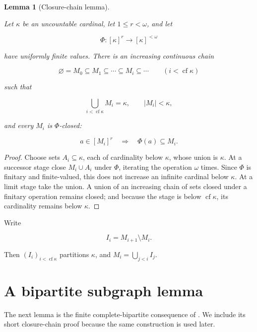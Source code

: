 \documentclass[a4paper,11pt,reqno]{amsart}
\theoremstyle{plain}
\newtheorem{lemma}[theorem]{Lemma}
\theoremstyle{definition}
\theoremstyle{remark}
\begin{document}
\begin{lemma}[Closure-chain lemma]\label{lemma-1.4-closure-chain-lemma}

Let \(\kappa\) be an uncountable cardinal, let \(1\le r<\omega\), and let

\[
\Phi:[\kappa]^r\longrightarrow[\kappa]^{<\omega}
\]

have uniformly finite values. There is an increasing continuous chain

\[
\varnothing=M_0\subseteq M_1\subseteq\cdots
\subseteq M_i\subseteq\cdots\qquad(i<\operatorname{cf}\kappa)
\]

such that

\[
\bigcup_{i<\operatorname{cf}\kappa}M_i=\kappa,
\qquad |M_i|<\kappa,
\]

and every \(M_i\) is \(\Phi\)-closed:

\[
a\in[M_i]^r\quad\Longrightarrow\quad\Phi(a)\subseteq M_i.
\]

\end{lemma}
\begin{proof}
Choose sets \(A_i\subseteq\kappa\), each of cardinality below \(\kappa\), whose union is \(\kappa\). At a successor stage close \(M_i\cup A_i\) under \(\Phi\), iterating the operation \(\omega\) times. Since \(\Phi\) is finitary and finite-valued, this does not increase an infinite cardinal below \(\kappa\). At a limit stage take the union. A union of an increasing chain of sets closed under a finitary operation remains closed; and because the stage is below \(\operatorname{cf}\kappa\), its cardinality remains below \(\kappa\).
\end{proof}

Write

\[
I_i=M_{i+1}\setminus M_i.
\]

Then \((I_i)_{i<\operatorname{cf}\kappa}\) partitions \(\kappa\), and \(M_i=\bigcup_{j<i}I_j\).

\section{A bipartite subgraph lemma}\label{the-graph-lemma-needed-for-the-expansion-atom}

The next lemma is the finite complete-bipartite consequence of
\citet[Corollary~5.6, p.~72]{erdoshajnal1966}. We include its short
closure-chain proof because the same construction is used later.
\end{document}
